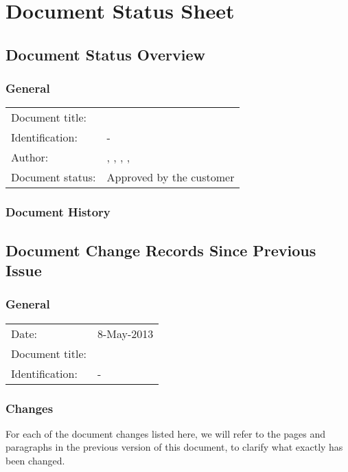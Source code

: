 \chapter*{Document Status Sheet}

\section*{Document Status Overview}
\subsection*{General}
\begin{tabular}[!]{l p{10cm}}
    Document title:     &   \TitleFull{} \\
    Identification:     &   \TitleAbbr{}-\Version{}\\
    Author:             &   \tessa{}, \roel{}, \benjamin{}, \femke{}, \hugo{} \\
    Document status:    &   Approved by the customer\\

\end{tabular}

\subsection*{Document History}

\section*{Document Change Records Since Previous Issue}
\subsection*{General}
\begin{tabular}[!]{ll}
    Date:          &   8-May-2013 \\
    Document title: &   \TitleFull{} \\
    Identification:  &   \TitleAbbr{}-\Version{}\\
\end{tabular}

\subsection*{Changes}
For each of the document changes listed here, we will refer to the pages and paragraphs in the previous version of this document, to clarify what exactly has been changed.


